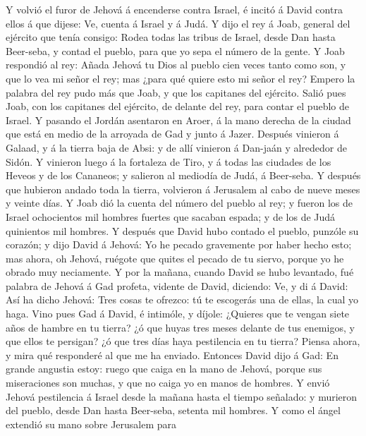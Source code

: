  Y volvió el furor de Jehová á encenderse contra Israel, é
incitó á David contra ellos á que dijese: Ve, cuenta á Israel y á Judá.
 Y dijo el rey á Joab, general del ejército que tenía
consigo: Rodea todas las tribus de Israel, desde Dan hasta Beer-seba, y
contad el pueblo, para que yo sepa el número de la gente. 
Y Joab respondió al rey: Añada Jehová tu Dios al pueblo cien veces tanto
como son, y que lo vea mi señor el rey; mas ¿para qué quiere esto mi
señor el rey?  Empero la palabra del rey pudo más que
Joab, y que los capitanes del ejército. Salió pues Joab, con los
capitanes del ejército, de delante del rey, para contar el pueblo de
Israel.  Y pasando el Jordán asentaron en Aroer, á la mano
derecha de la ciudad que está en medio de la arroyada de Gad y junto á
Jazer.  Después vinieron á Galaad, y á la tierra baja de
Absi: y de allí vinieron á Dan-jaán y alrededor de Sidón. 
Y vinieron luego á la fortaleza de Tiro, y á todas las ciudades de los
Heveos y de los Cananeos; y salieron al mediodía de Judá, á Beer-seba.
 Y después que hubieron andado toda la tierra, volvieron á
Jerusalem al cabo de nueve meses y veinte días.  Y Joab
dió la cuenta del número del pueblo al rey; y fueron los de Israel
ochocientos mil hombres fuertes que sacaban espada; y de los de Judá
quinientos mil hombres.  Y después que David hubo contado
el pueblo, punzóle su corazón; y dijo David á Jehová: Yo he pecado
gravemente por haber hecho esto; mas ahora, oh Jehová, ruégote que
quites el pecado de tu siervo, porque yo he obrado muy neciamente.
 Y por la mañana, cuando David se hubo levantado, fué
palabra de Jehová á Gad profeta, vidente de David, diciendo:
 Ve, y di á David: Así ha dicho Jehová: Tres cosas te
ofrezco: tú te escogerás una de ellas, la cual yo haga. 
Vino pues Gad á David, é intimóle, y díjole: ¿Quieres que te vengan
siete años de hambre en tu tierra? ¿ó que huyas tres meses delante de
tus enemigos, y que ellos te persigan? ¿ó que tres días haya pestilencia
en tu tierra? Piensa ahora, y mira qué responderé al que me ha enviado.
 Entonces David dijo á Gad: En grande angustia estoy:
ruego que caiga en la mano de Jehová, porque sus miseraciones son
muchas, y que no caiga yo en manos de hombres.  Y envió
Jehová pestilencia á Israel desde la mañana hasta el tiempo señalado: y
murieron del pueblo, desde Dan hasta Beer-seba, setenta mil hombres.
 Y como el ángel extendió su mano sobre Jerusalem para
